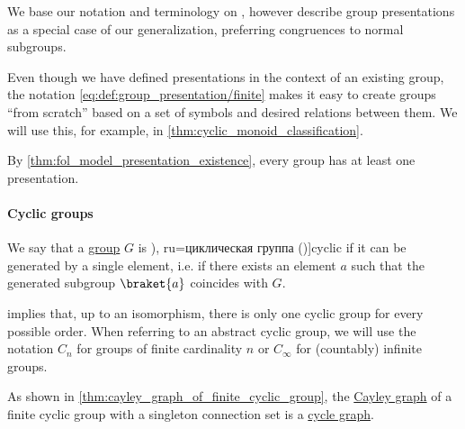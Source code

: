 \begin{comments}
  \item We base our notation and terminology on \cite[90]{Bourbaki1998Algebra1to3}, however describe group presentations as a special case of our generalization, preferring congruences to normal subgroups.

  \item Even though we have defined presentations in the context of an existing group, the notation \eqref{eq:def:group_presentation/finite} makes it easy to create groups \enquote{from scratch} based on a set of symbols and desired relations between them. We will use this, for example, in \cref{thm:cyclic_monoid_classification}.

  \item By \cref{thm:fol_model_presentation_existence}, every group has at least one presentation.
\end{comments}

\paragraph{Cyclic groups}

\begin{definition}\label{def:cyclic_group}
  We say that a \hyperref[def:group]{group} \( G \) is \term[ru=циклична группа (\cite[379]{Обрешков1962ВисшаАлгебра}), ru=циклическая группа (\cite[97]{Тыртышников2017ОсновыАлгебры})]{cyclic} if it can be generated by a single element, i.e. if there exists an element \( a \) such that the generated subgroup \( \braket{ a } \) coincides with \( G \).

   implies that, up to an isomorphism, there is only one cyclic group for every possible order. When referring to an abstract cyclic group, we will use the notation \( C_n \) for groups of finite cardinality \( n \) or \( C_\infty \) for (countably) infinite groups.
\end{definition}
\begin{comments}
  \item As shown in \cref{thm:cayley_graph_of_finite_cyclic_group}, the \hyperref[def:cayley_graph]{Cayley graph} of a finite cyclic group with a singleton connection set is a \hyperref[def:cycle_graph]{cycle graph}.
\end{comments}

